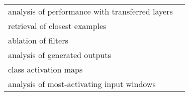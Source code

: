 \begin{tabular}{ll}
analysis of performance with transferred layers        &                                                                                                                                                                            \cite{Hajinoroozi2017} \\
retrieval of closest examples                          &                                                                                                                                                                                  \cite{Deiss2018} \\
ablation of filters                                    &                                                                                                                                                                                \cite{Lawhern2018} \\
analysis of generated outputs                          &                                                                                                                                                                               \cite{Hartmann2018} \\
class activation maps                                  &                                                                                                                                                                                  \cite{Ghosh2018} \\
analysis of most-activating input windows              &                                                                                                                                                                              \cite{Hartmann2018b} \\
\bottomrule
\end{tabular}
